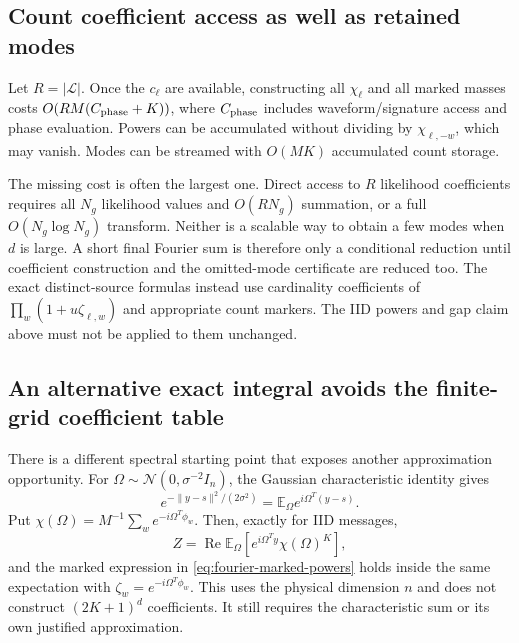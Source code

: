 \documentclass[10pt,a4paper]{article}
\newcommand{\E}{\mathbb E}
\begin{document}
\subsection{Count coefficient access as well as retained modes}
Let $R=|\mathcal L|$. Once the $c_\ell$ are available, constructing all $\chi_\ell$ and all marked masses
costs $O(RM(C_{\rm phase}+K))$, where $C_{\rm phase}$ includes waveform/signature access and phase
evaluation. Powers can be accumulated without dividing by $\chi_{\ell,-w}$, which may vanish.
Modes can be streamed with $O(MK)$ accumulated count storage.

The missing cost is often the largest one. Direct access to $R$ likelihood coefficients requires all
$N_g$ likelihood values and $O(RN_g)$ summation, or a full $O(N_g\log N_g)$ transform.
Neither is a scalable way to obtain a few modes when $d$ is large. A short final Fourier sum is therefore
only a conditional reduction until coefficient construction and the omitted-mode certificate are reduced too.
The exact distinct-source formulas instead use cardinality coefficients of
$\prod_w(1+u\zeta_{\ell,w})$ and appropriate count markers. The IID powers and gap claim above must not be
applied to them unchanged.

\subsection{An alternative exact integral avoids the finite-grid coefficient table}
There is a different spectral starting point that exposes another approximation opportunity.
For $\Omega\sim\mathcal N(0,\sigma^{-2}I_n)$, the Gaussian characteristic identity gives
\[
 e^{-\|y-s\|^2/(2\sigma^2)}
   =\E_\Omega e^{i\Omega^T(y-s)}.
\]
Put $\chi(\Omega)=M^{-1}\sum_w e^{-i\Omega^T\phi_w}$. Then, exactly for IID messages,
\[
 Z=\operatorname{Re}\E_\Omega[e^{i\Omega^Ty}\chi(\Omega)^K],
\]
and the marked expression in \eqref{eq:fourier-marked-powers} holds inside the same expectation with
$\zeta_w=e^{-i\Omega^T\phi_w}$. This uses the physical dimension $n$ and does not construct
$(2K+1)^d$ coefficients. It still requires the characteristic sum or its own justified approximation.
\end{document}
